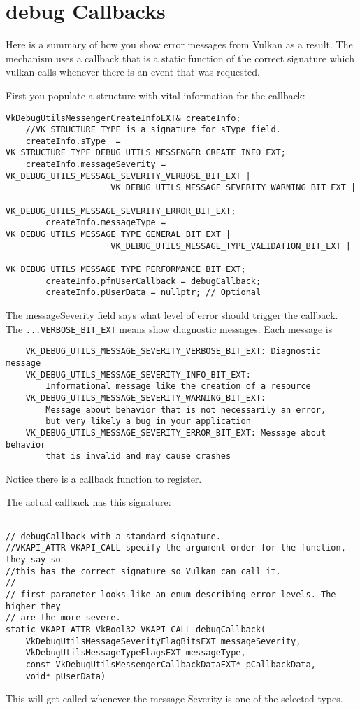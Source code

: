 \documentclass{article}
\begin{document}
\section{debug Callbacks}
Here is a summary of how you show error messages from Vulkan as a result.  The
mechanism uses a callback that is a static function of the correct signature
which vulkan calls whenever there is an event that  was requested. 

First you populate a structure with vital information for the callback:
\begin{verbatim}
VkDebugUtilsMessengerCreateInfoEXT& createInfo;
    //VK_STRUCTURE_TYPE is a signature for sType field.
	createInfo.sType  = VK_STRUCTURE_TYPE_DEBUG_UTILS_MESSENGER_CREATE_INFO_EXT;
	createInfo.messageSeverity = VK_DEBUG_UTILS_MESSAGE_SEVERITY_VERBOSE_BIT_EXT | 
				     VK_DEBUG_UTILS_MESSAGE_SEVERITY_WARNING_BIT_EXT | 
                                     VK_DEBUG_UTILS_MESSAGE_SEVERITY_ERROR_BIT_EXT;
        createInfo.messageType = VK_DEBUG_UTILS_MESSAGE_TYPE_GENERAL_BIT_EXT | 
			         VK_DEBUG_UTILS_MESSAGE_TYPE_VALIDATION_BIT_EXT | 
                                 VK_DEBUG_UTILS_MESSAGE_TYPE_PERFORMANCE_BIT_EXT;
        createInfo.pfnUserCallback = debugCallback;
        createInfo.pUserData = nullptr; // Optional   
\end{verbatim}
The messageSeverity field says what level of error should trigger the callback.
The \verb|...VERBOSE_BIT_EXT| means show diagnostic messages. Each message is
\begin{verbatim}
    VK_DEBUG_UTILS_MESSAGE_SEVERITY_VERBOSE_BIT_EXT: Diagnostic message
    VK_DEBUG_UTILS_MESSAGE_SEVERITY_INFO_BIT_EXT: 
		Informational message like the creation of a resource
    VK_DEBUG_UTILS_MESSAGE_SEVERITY_WARNING_BIT_EXT: 
		Message about behavior that is not necessarily an error, 
		but very likely a bug in your application
    VK_DEBUG_UTILS_MESSAGE_SEVERITY_ERROR_BIT_EXT: Message about behavior 
		that is invalid and may cause crashes
\end{verbatim}

Notice there is a callback function to register.

The actual callback has this signature:
\begin{verbatim}

// debugCallback with a standard signature.
//VKAPI_ATTR VKAPI_CALL specify the argument order for the function, they say so
//this has the correct signature so Vulkan can call it.
//
// first parameter looks like an enum describing error levels. The higher they
// are the more severe.
static VKAPI_ATTR VkBool32 VKAPI_CALL debugCallback(
    VkDebugUtilsMessageSeverityFlagBitsEXT messageSeverity,
    VkDebugUtilsMessageTypeFlagsEXT messageType,
    const VkDebugUtilsMessengerCallbackDataEXT* pCallbackData,
    void* pUserData) 
\end{verbatim}
This will get called whenever the message Severity is one of the selected types.
\end{document}
